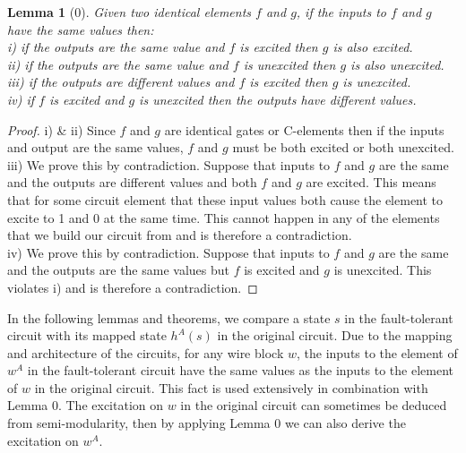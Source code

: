 \documentclass[12pt]{report}
\newtheorem*{lemma}{Lemma}
\begin{document}
\begin{lemma}[0]
Given two identical elements $f$ and $g$, if the inputs to $f$ and $g$ have the same values then:\\
i)  if the outputs are the same value and $f$ is excited then $g$ is also excited.\\
ii)  if the outputs are the same value and $f$ is unexcited then $g$ is also unexcited.\\
iii)  if the outputs are different values and $f$ is excited then $g$ is unexcited.\\
iv)  if $f$ is excited and $g$ is unexcited then the outputs have different values.
\end{lemma}
\begin{proof}
i) \& ii)  Since $f$ and $g$ are identical gates or C-elements then if the inputs and output are the same values, $f$ and $g$ must be both excited or both unexcited. \\
iii)  We prove this by contradiction.  Suppose that inputs to $f$ and $g$ are the same and the outputs are different values and both $f$ and $g$ are excited.  This means that for some circuit element that these input values both cause the element to excite to 1 and 0 at the same time.  This cannot happen in any of the elements that we build our circuit from and is therefore a contradiction.\\
iv)  We prove this by contradiction.  Suppose that inputs to $f$ and $g$ are the same and the outputs are the same values but $f$ is excited and $g$ is unexcited.  This violates i) and is therefore a contradiction.  
\end{proof}

In the following lemmas and theorems, we compare a state $s$ in the fault-tolerant circuit with its mapped state $h^A(s)$ in the original circuit.  Due to the mapping and architecture of the circuits, for any wire block $w$, the inputs to the element of $w^A$ in the fault-tolerant circuit have the same values as the inputs to the element of $w$ in the original circuit.  This fact is used extensively in combination with Lemma 0.  The excitation on $w$ in the original circuit can sometimes be deduced from semi-modularity, then by applying Lemma 0 we can also derive the excitation on $w^A$.  \\
\end{document}
